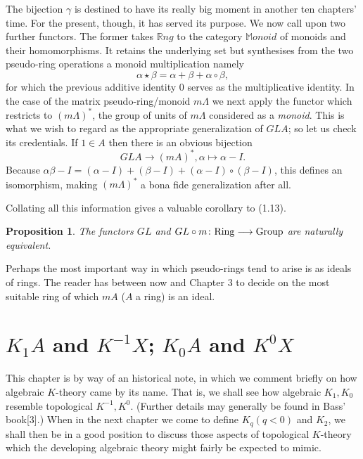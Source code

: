 \documentclass[openany,leqno]{book}  %
\newtheorem{prop}[theorem]{Proposition}
\begin{document}
The bijection $\gamma$ is destined to have its really big moment in another ten chapters' time. For the present, though, it has served its purpose. We now call upon two further functors. The former takes $ \mathbb{R}ng$ to the category $\mathbb{M}onoid$ of monoids and their homomorphisms. It retains the underlying set but synthesises from the two pseudo-ring operations a monoid multiplication namely 
\[\alpha \star \beta=\alpha+\beta+\alpha\circ \beta,\]
for which the previous additive identity $0$ serves as the multiplicative identity. In the case of the matrix pseudo-ring/monoid $m\Lambda$ we next apply the functor which restricts to $(m\Lambda)^*$, the group of units of $m\Lambda$ considered as a {\em monoid}. This is what we wish to regard as the appropriate generalization of $GLA$; so let us check its credentials. If $1\in A$ then there is an obvious bijection
\[GLA\longrightarrow (mA)^*,\alpha\mapsto \alpha-I.\]
Because $\alpha\beta-I=(\alpha-I)+(\beta-I)+(\alpha-I)\circ(\beta-I)$, this defines an isomorphism, making $(m\Lambda)^*$ a bona fide generalization after all.

Collating all this information gives a valuable corollary to (1.13).
\begin{prop}
The functors $GL$ and $GL\circ m\colon  {\rm Ring}\longrightarrow{\rm Group}$ are naturally equivalent.
\end{prop}
Perhaps the most important way in which pseudo-rings tend to arise is as ideals of rings. The reader has between now and Chapter 3 to decide on the most suitable ring of which $mA$ ($A$ a ring) is an ideal.

\chapter{$K_1 A$ and $K^{-1} X$; $K_0A$ and $K^0 X$}
\label{cha:2k_1a_and_k-1x_k0a_and_k0x}

This chapter is by way of an historical note, in which we comment briefly on how algebraic 
$K$-theory came by its name. That is, we shall see how algebraic $K_1,K_0$ resemble topological $K^{-1},K^0$. (Further details may generally be found in Bass' book[3].) When in the next chapter we come to define $K_q(q<0)$ and $K_2$, we shall then be in a good position to discuss those aspects of topological $K$-theory which the developing algebraic theory might fairly be expected to mimic.
\end{document}
